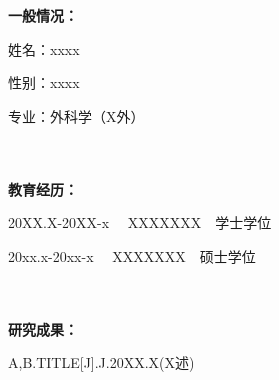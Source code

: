 


\begin{flushleft}
	~\\
	~\\
	\textbf{一般情况：}
	
	姓名：xxxx
	
	性别：xxxx
	
	专业：外科学（X外）
	
	~\\
	~\\
	
	\textbf{教育经历：}
	
	20XX.X-20XX-x ~~XXXXXXX~~学士学位
	
	20xx.x-20xx-x ~~XXXXXXX~~硕士学位
	
	~\\
	~\\
	
	\textbf{研究成果：}
	
A,B.TITLE[J].J.20XX.X(X述)
	
	\vspace{3em}\noindent
	\textbf{~}
\end{flushleft}
